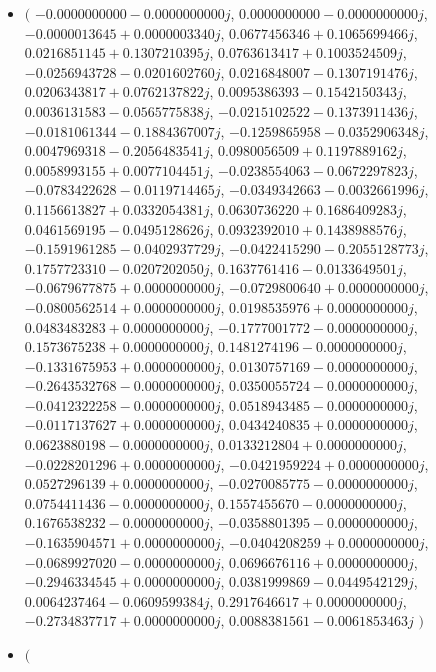 \documentclass[14pt,a4paper]{article}
\begin{document}
\begin{itemize}
\item
$\big($
$-0.0000000000-0.0000000000j$, $0.0000000000-0.0000000000j$, $-0.0000013645+0.0000003340j$, $0.0677456346+0.1065699466j$, $0.0216851145+0.1307210395j$, $0.0763613417+0.1003524509j$, $-0.0256943728-0.0201602760j$, $0.0216848007-0.1307191476j$, $0.0206343817+0.0762137822j$, $0.0095386393-0.1542150343j$, $0.0036131583-0.0565775838j$, $-0.0215102522-0.1373911436j$, $-0.0181061344-0.1884367007j$, $-0.1259865958-0.0352906348j$, $0.0047969318-0.2056483541j$, $0.0980056509+0.1197889162j$, $0.0058993155+0.0077104451j$, $-0.0238554063-0.0672297823j$, $-0.0783422628-0.0119714465j$, $-0.0349342663-0.0032661996j$, $0.1156613827+0.0332054381j$, $0.0630736220+0.1686409283j$, $0.0461569195-0.0495128626j$, $0.0932392010+0.1438988576j$, $-0.1591961285-0.0402937729j$, $-0.0422415290-0.2055128773j$, $0.1757723310-0.0207202050j$, $0.1637761416-0.0133649501j$, $-0.0679677875+0.0000000000j$, $-0.0729800640+0.0000000000j$, $-0.0800562514+0.0000000000j$, $0.0198535976+0.0000000000j$, $0.0483483283+0.0000000000j$, $-0.1777001772-0.0000000000j$, $0.1573675238+0.0000000000j$, $0.1481274196-0.0000000000j$, $-0.1331675953+0.0000000000j$, $0.0130757169-0.0000000000j$, $-0.2643532768-0.0000000000j$, $0.0350055724-0.0000000000j$, $-0.0412322258-0.0000000000j$, $0.0518943485-0.0000000000j$, $-0.0117137627+0.0000000000j$, $0.0434240835+0.0000000000j$, $0.0623880198-0.0000000000j$, $0.0133212804+0.0000000000j$, $-0.0228201296+0.0000000000j$, $-0.0421959224+0.0000000000j$, $0.0527296139+0.0000000000j$, $-0.0270085775-0.0000000000j$, $0.0754411436-0.0000000000j$, $0.1557455670-0.0000000000j$, $0.1676538232-0.0000000000j$, $-0.0358801395-0.0000000000j$, $-0.1635904571+0.0000000000j$, $-0.0404208259+0.0000000000j$, $-0.0689927020-0.0000000000j$, $0.0696676116+0.0000000000j$, $-0.2946334545+0.0000000000j$, $0.0381999869-0.0449542129j$, $0.0064237464-0.0609599384j$, $0.2917646617+0.0000000000j$, $-0.2734837717+0.0000000000j$, $0.0088381561-0.0061853463j$
$\big)$
\item
$\big($

\end{itemize}
\end{document}
